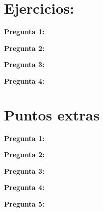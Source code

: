 \documentclass{assignment}
\begin{document}
\maketitle


\section{Ejercicios: }
\textbf{Pregunta 1:}



\textbf{Pregunta 2:}


\textbf{Pregunta 3:}


\textbf{Pregunta 4:}



\section{Puntos extras}

 \textbf{Pregunta 1:}



 \textbf{Pregunta 2:}


 \textbf{Pregunta 3:}


\textbf{Pregunta 4:}

\textbf{Pregunta 5:}
\end{document}
